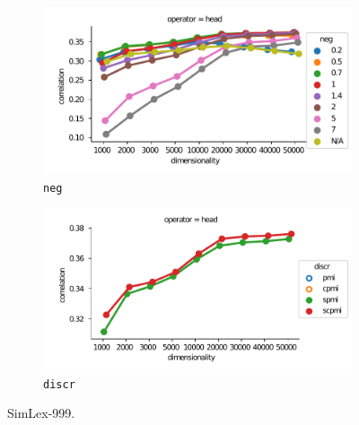 \begin{figure}[h]
  \centering

  \begin{subfigure}[t]{0.49\textwidth}
  \includegraphics[width=\textwidth]{supplement/figures/SimLex999-interaction-neg}

  \caption{\texttt{neg}}
  \label{fig:SimLex999-neg}
  \end{subfigure}
  \begin{subfigure}[t]{0.49\textwidth}
  \includegraphics[width=\textwidth]{supplement/figures/SimLex999-interaction-discr}

  \caption{\texttt{discr}}
  \label{fig:SimLex999-discr}
  \end{subfigure}

  \caption{SimLex-999.}
\end{figure}
